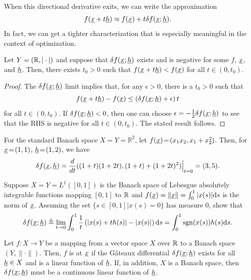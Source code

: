 When this directional derivative exits, we can write the approximation
\begin{equation*}
f(\underline{x} + t \underline{h}) \approx f(\underline{x}) + t \delta f (\underline{x}; \underline{h}) .
\end{equation*}
In fact, we can get a tighter characterization that is especially meaningful in the context of optimization.

\begin{lemma}
\label{lemma:gateaux_negative}
Let $Y = (\mathbb{R},|\cdot|)$ and suppose that $\delta f (\underline{x};\underline{h})$ exists and is negative for some $f$, $\underline{x}$, and $\underline{h}$.  Then, there exists $t_0 > 0$ such that $f(\underline{x}+t \underline{h}) < f (\underline{x})$ for all $t\in(0,t_0)$.
\end{lemma}
\begin{proof}
The $\delta f (\underline{x};\underline{h})$ limit implies that, for any $\epsilon > 0$, there is a $t_0 > 0$ such that
\[ f(\underline{x}+t \underline{h}) - f (\underline{x}) \leq \left( \delta f (\underline{x};\underline{h}) + \epsilon \right)t \]
for all $t\in (0,t_0)$.
If $\delta f (\underline{x};\underline{h})<0$, then one can choose $\epsilon = -\frac{1}{2}\delta f (\underline{x};\underline{h})$ to see that the RHS is negative for all $t\in (0,t_0)$.
The stated result follows.
\end{proof}

\begin{example}
For the standard Banach space $X\!=\!Y\!=\!\mathbb{R}^2$, let $f(\underline{x})\! =\! (x_1 x_2,x_1+x_2^2)$.
Then, for $\underline{x}\!=\!(1,1)$, $\underline{h}\!=\!(1,2)$, we have
\[ \delta f ( \underline{x},\underline{h} ) = \frac{d}{dt} ((1+t)(1+2t),(1+t)+(1+2t)^2) \Big|_{t=0} = (3,5). \]
\end{example}

\begin{problem}
Suppose $X=Y=L^1 ([0,1])$ is the Banach space of Lebesgue absolutely integrable functions mapping $[0,1]$ to $\mathbb{R}$ and $f(\underline{x}) = \| \underline{x} \| = \int_0^1 |x(s)| \mathrm{d} s$ is the norm of $\underline{x}$.
Assuming the set $\{ s\in [0,1] | x(s)=0 \}$ has measure 0, show that
\[ \delta f (\underline{x};\underline{h}) \triangleq \lim_{t \to 0}  \int_0^1 \frac{1}{t} \left( |x(s)+t h(s)| - |x(s)| \right) \mathrm{d} s = \int_0^1 \mathrm{sgn}(x(s)) h(s) \mathrm{d} s. \] 
\end{problem}

\begin{definition}
Let $f \colon X \rightarrow Y$ be a mapping from a vector space $X$ over $\mathbb{R}$ to a Banach space $(Y,\|\cdot\|)$.
Then, $f$ is  at $\underline{x}$ if the G\^{a}teaux differential $\delta f (\underline{x};\underline{h})$ exists for all $\underline{h} \in X$ and is a linear function of $\underline{h}$.
If, in addition, $X$ is a Banach space, then $\delta f (\underline{x};\underline{h})$ must be a continuous linear function of $\underline{h}$.
\end{definition}

